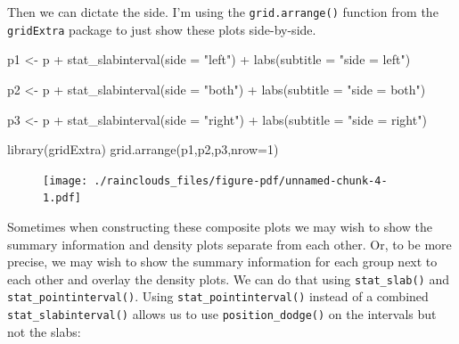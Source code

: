 \documentclass[
  letterpaper,
  DIV=11,
  numbers=noendperiod]{scrreprt}
\newenvironment{Shaded}{\begin{snugshade}}{\end{snugshade}}
\newcommand{\AttributeTok}[1]{\textcolor[rgb]{0.40,0.45,0.13}{#1}}
\newcommand{\DecValTok}[1]{\textcolor[rgb]{0.68,0.00,0.00}{#1}}
\newcommand{\FunctionTok}[1]{\textcolor[rgb]{0.28,0.35,0.67}{#1}}
\newcommand{\NormalTok}[1]{\textcolor[rgb]{0.00,0.23,0.31}{#1}}
\newcommand{\OtherTok}[1]{\textcolor[rgb]{0.00,0.23,0.31}{#1}}
\newcommand{\SpecialCharTok}[1]{\textcolor[rgb]{0.37,0.37,0.37}{#1}}
\newcommand{\StringTok}[1]{\textcolor[rgb]{0.13,0.47,0.30}{#1}}
\begin{document}
Then we can dictate the side. I'm using the \texttt{grid.arrange()}
function from the \texttt{gridExtra} package to just show these plots
side-by-side.

\begin{Shaded}
\begin{Highlighting}[]
\NormalTok{p1 }\OtherTok{\textless{}{-}}\NormalTok{ p }\SpecialCharTok{+} \FunctionTok{stat\_slabinterval}\NormalTok{(}\AttributeTok{side =} \StringTok{"left"}\NormalTok{) }\SpecialCharTok{+}
  \FunctionTok{labs}\NormalTok{(}\AttributeTok{subtitle =} \StringTok{"side = \textquotesingle{}left\textquotesingle{}"}\NormalTok{)}

\NormalTok{p2 }\OtherTok{\textless{}{-}}\NormalTok{ p }\SpecialCharTok{+} \FunctionTok{stat\_slabinterval}\NormalTok{(}\AttributeTok{side =} \StringTok{"both"}\NormalTok{) }\SpecialCharTok{+}
  \FunctionTok{labs}\NormalTok{(}\AttributeTok{subtitle =} \StringTok{"side = \textquotesingle{}both\textquotesingle{}"}\NormalTok{)}

\NormalTok{p3 }\OtherTok{\textless{}{-}}\NormalTok{ p }\SpecialCharTok{+} \FunctionTok{stat\_slabinterval}\NormalTok{(}\AttributeTok{side =} \StringTok{"right"}\NormalTok{) }\SpecialCharTok{+}
  \FunctionTok{labs}\NormalTok{(}\AttributeTok{subtitle =} \StringTok{"side = \textquotesingle{}right\textquotesingle{}"}\NormalTok{)}

\FunctionTok{library}\NormalTok{(gridExtra)}
\FunctionTok{grid.arrange}\NormalTok{(p1,p2,p3,}\AttributeTok{nrow=}\DecValTok{1}\NormalTok{)}
\end{Highlighting}
\end{Shaded}

\begin{figure}[H]

{\centering \texttt{[image: ./rainclouds\_files/figure-pdf/unnamed-chunk-4-1.pdf]}

}

\end{figure}

Sometimes when constructing these composite plots we may wish to show
the summary information and density plots separate from each other. Or,
to be more precise, we may wish to show the summary information for each
group next to each other and overlay the density plots. We can do that
using \texttt{stat\_slab()} and \texttt{stat\_pointinterval()}. Using
\texttt{stat\_pointinterval()} instead of a combined
\texttt{stat\_slabinterval()} allows us to use
\texttt{position\_dodge()} on the intervals but not the slabs:
\end{document}
